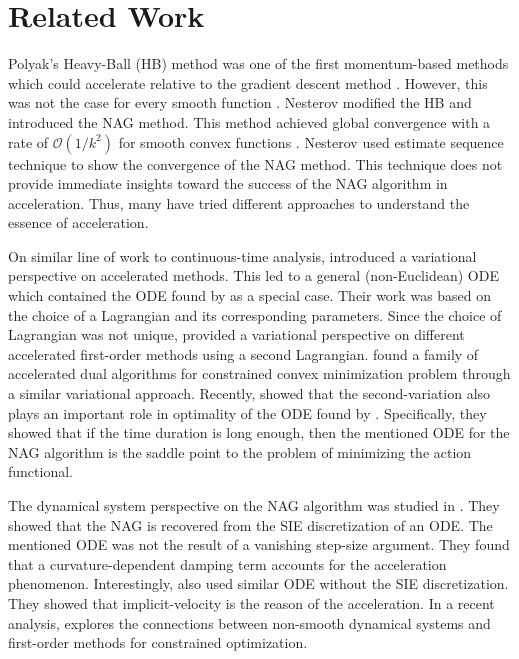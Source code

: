 \documentclass{article}
\theoremstyle{plain}
\theoremstyle{definition}
\theoremstyle{remark}
\begin{document}
\section{Related Work}\label{sec_relwork}
Polyak's Heavy-Ball (HB) method was one of the first momentum-based methods which could accelerate relative to the gradient descent method \citep{Polyak1963GradientMF}. However, this was not the case for every smooth function \citep{Lessard2016AnalysisAD}. Nesterov modified the HB and introduced the NAG method. This method achieved global convergence with a rate of $\mathcal{O}(1/k^2)$ for smooth convex functions \citep{Nesterov1983AMF}. Nesterov used estimate sequence technique to show the convergence of the NAG method. This technique does not provide immediate insights toward the success of the NAG algorithm in acceleration. Thus, many have tried different approaches to understand the essence of acceleration. \par
On similar line of work to continuous-time analysis, \citep{WibisonoE7351} introduced a variational perspective on accelerated methods. This led to a general (non-Euclidean) ODE which contained the ODE found by \citep{JMLR:v17:15-084} as a special case. Their work was based on the choice of a Lagrangian and its corresponding parameters. Since the choice of Lagrangian was not unique, \citep{wilson2021lyapunov} provided a variational perspective on different accelerated first-order methods using a second Lagrangian. \citep{7963773} found a family of accelerated dual algorithms for constrained convex minimization problem through a similar variational approach. Recently, \citep{zhang2021rethinking} showed that the second-variation also plays an important role in optimality of the ODE found by \citep{JMLR:v17:15-084}. Specifically, they showed that if the time duration is long enough, then the mentioned ODE for the NAG algorithm is the saddle point to the problem of minimizing the action functional. \par
The dynamical system perspective on the NAG algorithm was studied in \citep{muehlebach2019dynamical}. They showed that the NAG is recovered from the SIE discretization of an ODE. The mentioned ODE was not the result of a vanishing step-size argument. They found that a curvature-dependent damping term accounts for the acceleration phenomenon. Interestingly, \citep{chen2022gradient} also used similar ODE without the SIE discretization. They showed that implicit-velocity is the reason of the acceleration. In a recent analysis, \citep{muehlebach2023accelerated} explores the connections between non-smooth dynamical systems and first-order methods for constrained optimization.
\end{document}
